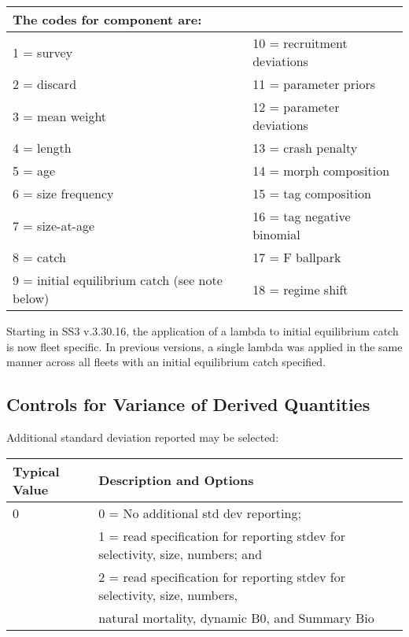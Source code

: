 \begin{center}
	\begin{longtable}{ p{7.5cm} p{7.5cm} }
		\multicolumn{2}{l}{The codes for component are:}\\
		\hline
		1 = survey  				   & 10 = recruitment deviations \Tstrut\\	
		2 = discard 				   & 11 = parameter priors\\		
		3 = mean weight 			   & 12 = parameter deviations\\	
		4 = length 					   & 13 = crash penalty\\		
		5 = age 					   & 14 = morph composition\\
		6 = size frequency  		   & 15 = tag composition\\		
		7 = size-at-age 			   & 16 = tag negative binomial\\
		8 = catch 					   & 17 = F ballpark\\		
		9 = initial equilibrium catch (see note below) & 18 = regime shift \Bstrut\\
		\hline
	\end{longtable}
\end{center}

Starting in SS3 v.3.30.16, the application of a lambda to initial equilibrium catch is now fleet specific.  In previous versions, a single lambda was applied in the same manner across all fleets with an initial equilibrium catch specified.

\pagebreak

\subsection{Controls for Variance of Derived Quantities}
Additional standard deviation reported may be selected:

\begin{longtable}{p{1.1cm} p{1.4cm} p{1.2cm} p{1.2cm} p{1.3cm} p{1.6cm} p{1.4cm} p{1.4cm} p{1.4cm}}

	\hline
	\multicolumn{3}{l}{Typical Value} & \multicolumn{6}{l}{Description and Options}\Tstrut\Bstrut\\
	\hline
	\endfirsthead


	\multicolumn{3}{l}{0} & \multicolumn{6}{l}{0 = No additional std dev reporting;} \Tstrut\\
	\multicolumn{3}{l}{ } & \multicolumn{6}{l}{1 = read specification for reporting stdev for selectivity, size, numbers; and}\Bstrut\\
	\multicolumn{3}{l}{ } & \multicolumn{6}{l}{2 = read specification for reporting stdev for selectivity, size, numbers, }\Bstrut\\
	\multicolumn{3}{l}{ } & \multicolumn{6}{l}{natural mortality, dynamic B0, and Summary Bio}\Bstrut\\
	\hline

\end{longtable}

